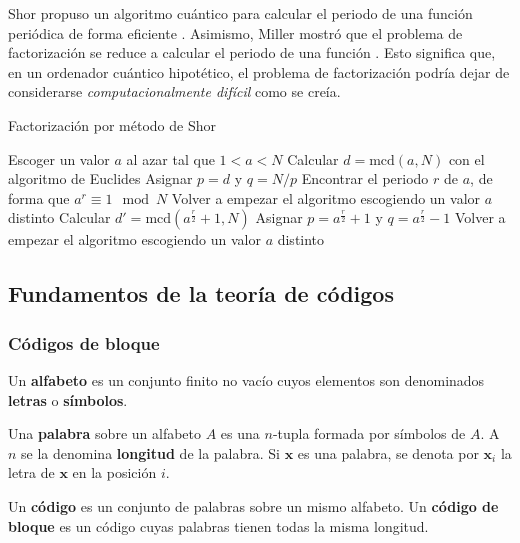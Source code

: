 Shor propuso un algoritmo cuántico para calcular el periodo de una función periódica de forma eficiente \autocite{Shor_1997}. Asimismo, Miller mostró que el problema de factorización se reduce a calcular el periodo de una función \autocite{MILLER1976300}. Esto significa que, en un ordenador cuántico hipotético, el problema de factorización podría dejar de considerarse \textit{computacionalmente difícil} como se creía.

\begin{algorithm}
	\caption{Factorización por método de Shor}\label{}
	Escoger un valor $a$ al azar tal que $1 < a < N$\;
	Calcular $d = \mathrm{mcd}(a, N)$ con el algoritmo de Euclides\;
	{
		Asignar $p = d$ y $q = N/p$\;
	}
	{
		Encontrar el periodo $r$ de $a$, de forma que $a^r \equiv 1 \mod N$\;
		{
			Volver a empezar el algoritmo escogiendo un valor $a$ distinto\;
		}
		{
			Calcular $d' = \mathrm{mcd}(a^{\frac{r}{2}} + 1, N)$\;
			{
				Asignar $p = a^{\frac{r}{2}} + 1$ y $q = a^{\frac{r}{2}} - 1$\;
			}
			{
				Volver a empezar el algoritmo escogiendo un valor $a$ distinto\;
			}
		}
	}
\end{algorithm}

\newpage

\subsection{Fundamentos de la teoría de códigos}

\subsubsection{Códigos de bloque}

\begin{definition}
	Un \textbf{alfabeto} es un conjunto finito no vacío cuyos elementos son denominados \textbf{letras} o \textbf{símbolos}.
\end{definition}

\begin{definition}
	Una \textbf{palabra} sobre un alfabeto $A$ es una $n$-tupla formada por símbolos de $A$. A $n$ se la denomina \textbf{longitud} de la palabra. Si $\textbf{x}$ es una palabra, se denota por $\textbf{x}_i$ la letra de $\textbf{x}$ en la posición $i$.
\end{definition}

\begin{definition}
	Un \textbf{código} es un conjunto de palabras sobre un mismo alfabeto. Un \textbf{código de bloque} es un código cuyas palabras tienen todas la misma longitud.
\end{definition}

